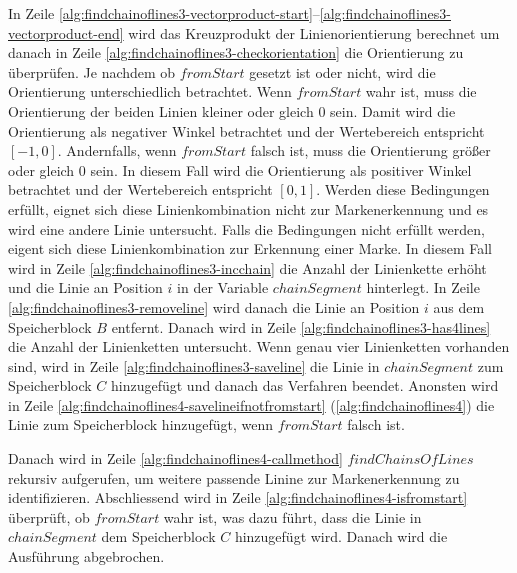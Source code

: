 In Zeile \ref{alg:findchainoflines3-vectorproduct-start}--\ref{alg:findchainoflines3-vectorproduct-end} wird das
 Kreuzprodukt der Linienorientierung berechnet um danach in Zeile \ref{alg:findchainoflines3-checkorientation} die
 Orientierung zu überprüfen. Je nachdem ob $\mathit{fromStart}$ gesetzt ist oder nicht, wird die Orientierung
 unterschiedlich betrachtet. Wenn $\mathit{fromStart}$ wahr ist, muss die Orientierung der beiden Linien kleiner oder
 gleich $0$ sein. Damit wird die Orientierung als negativer Winkel betrachtet und der Wertebereich entspricht
 $\left[-1,0\right]$. Andernfalls, wenn $\mathit{fromStart}$ falsch ist, muss die Orientierung größer oder gleich $0$
 sein. In diesem Fall wird die Orientierung als positiver Winkel betrachtet und der Wertebereich entspricht
 $\left[0,1\right]$. Werden diese Bedingungen erfüllt, eignet sich diese Linienkombination nicht zur Markenerkennung
 und es wird eine andere Linie untersucht. Falls die Bedingungen nicht erfüllt werden, eigent sich diese
 Linienkombination zur Erkennung einer Marke. In diesem Fall wird in Zeile \ref{alg:findchainoflines3-incchain} die
 Anzahl der Linienkette erhöht und die Linie an Position $i$ in der Variable $\mathit{chainSegment}$ hinterlegt. In
 Zeile \ref{alg:findchainoflines3-removeline} wird danach die Linie an Position $i$ aus dem Speicherblock $B$ entfernt.
 Danach wird in Zeile \ref{alg:findchainoflines3-has4lines} die Anzahl der Linienketten untersucht. Wenn genau vier
 Linienketten vorhanden sind, wird in Zeile \ref{alg:findchainoflines3-saveline} die Linie in $\mathit{chainSegment}$
 zum Speicherblock $C$ hinzugefügt und danach das Verfahren beendet. Anonsten wird in Zeile
 \ref{alg:findchainoflines4-savelineifnotfromstart} (\autoref{alg:findchainoflines4}) die Linie zum Speicherblock
 hinzugefügt, wenn $\mathit{fromStart}$ falsch ist.



Danach wird in Zeile \ref{alg:findchainoflines4-callmethod} $\mathit{findChainsOfLines}$ rekursiv aufgerufen, um
 weitere passende Linine zur Markenerkennung zu identifizieren. Abschliessend wird in Zeile
 \ref{alg:findchainoflines4-isfromstart} überprüft, ob $\mathit{fromStart}$ wahr ist, was dazu führt, dass die Linie in
 $\mathit{chainSegment}$ dem Speicherblock $C$ hinzugefügt wird. Danach wird die Ausführung abgebrochen.
